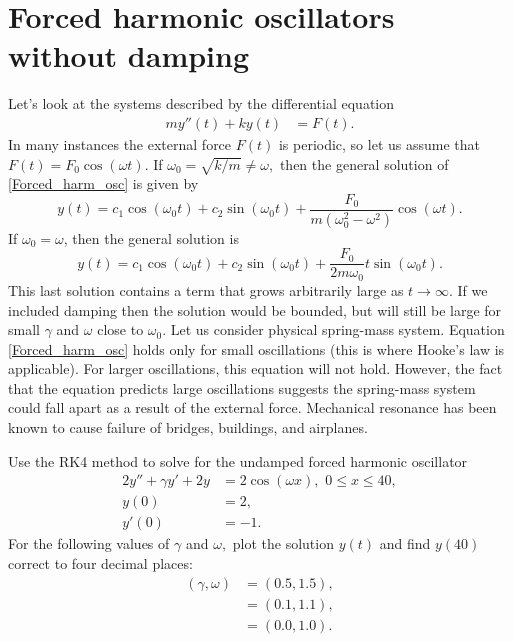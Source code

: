 \section*{Forced harmonic oscillators without damping}
Let's look at the systems described by the differential equation
\begin{align}
my''(t)  + ky(t) &= F(t). \label{Forced_harm_osc}
\end{align}
In many instances the external force $F(t)$ is periodic, so let us assume that $F(t) = F_0 \cos(\omega t)$. If $\omega_0 = \sqrt{k/m} \not = \omega,$ then the  general solution of \ref{Forced_harm_osc} is given by 
\[y(t) = c_1 \cos (\omega_0 t) + c_2\sin (\omega_0 t) + \frac{F_0}{m(\omega_0^2 - \omega^2)} \cos (\omega t).\]
If $\omega_0 = \omega$, then the general solution is 
\[y(t) = c_1 \cos (\omega_0 t) + c_2\sin (\omega_0 t) + \frac{F_0}{2m\omega_0} t \sin (\omega_0 t).\]
This last solution contains a term that grows arbitrarily large as $t \to \infty$. 
If we included damping then the solution would be bounded, but will still be large for small $\gamma$ and $\omega$ close to $\omega_0$. 
Let us consider physical spring-mass system. 
Equation \ref{Forced_harm_osc} holds only for small oscillations (this is where Hooke's law is applicable). 
For larger oscillations, this equation will not hold. 
However, the fact that the equation predicts large oscillations suggests the spring-mass system could fall apart as a result of the external force. Mechanical resonance has 
been known to cause failure of bridges, buildings, and airplanes.



\begin{problem}
Use the RK4 method to solve for the undamped forced harmonic oscillator
\begin{align*}
2y'' + \gamma y' + 2y &= 2 \cos (\omega x), \,\, 0 \leq x \leq 40,\\
y(0) &= 2, \\
y'(0) &= -1.
\end{align*} 
For the following values of $\gamma$ and $\omega,$ plot the solution $y(t)$ and find $y(40)$ correct to four decimal places: 
\begin{align*}
	(\gamma, \omega) &= (0.5, 1.5),\\
	 &= (0.1, 1.1), \\
	&= (0.0, 1.0).
\end{align*}
\end{problem}


